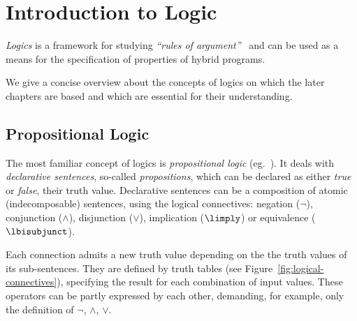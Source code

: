 \chapter{Introduction to Logic}
    \label{sec:introduction-logic}

    \emph{Logics} is a framework for studying \emph{``rules of argument''}~\cite{Hodges01ClassicalLogic} and can be used as a means for the specification of properties of hybrid programs.

    We give a concise overview about the concepts of logics on which the later chapters are based and which are essential for their understanding.


    \section{Propositional Logic}
        \label{sec:propositional-logic}


        The most familiar concept of logics is \emph{propositional logic} (eg.~\cite{Huth04LogicInCS}). It deals with \emph{declarative sentences}, so-called \emph{propositions}, which can be declared as either \emph{true} %
        or \emph{false}, %
        their truth value.
        Declarative sentences can be a composition of atomic (indecomposable) sentences, using the logical connectives: negation ($\lnot$), conjunction ($\land$), disjunction ($\lor$), implication ($\limply$) or equivalence ($\lbisubjunct$).

        Each connection admits a new truth value depending on the the truth values of its sub-sentences. They are defined by truth tables (see Figure~\ref{fig:logical-connectives}), specifying the result for each combination of input values. These operators can be partly expressed by each other, demanding, for example, only the definition of $\lnot$, $\land$, $\lor$.

